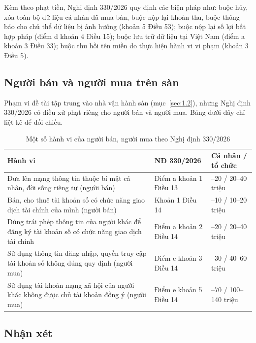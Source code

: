 Kèm theo phạt tiền, Nghị định 330/2026 quy định các biện pháp như: buộc hủy, xóa toàn bộ dữ liệu cá nhân đã mua bán, buộc nộp lại khoản thu, buộc thông báo cho chủ thể dữ liệu bị ảnh hưởng (khoản 5 Điều 53); buộc nộp lại số lợi bất hợp pháp (điểm d khoản 4 Điều 15); buộc lưu trữ dữ liệu tại Việt Nam (điểm a khoản 3 Điều 33); buộc thu hồi tên miền do thực hiện hành vi vi phạm (khoản 3 Điều 5).

\subsection{Người bán và người mua trên sàn}\label{sec:7.3}

Phạm vi đề tài tập trung vào nhà vận hành sàn (mục~\ref{sec:1.2}), nhưng Nghị định 330/2026 có điều xử phạt riêng cho người bán và người mua. Bảng dưới đây chỉ liệt kê để đối chiếu.

{\small{}
\begin{table}[H]
\centering
\caption{Một số hành vi của người bán, người mua theo Nghị định 330/2026}\label{tab:7.2}
\begin{tabularx}{\textwidth}{>{\hsize=1.4\hsize\raggedright\arraybackslash}X>{\hsize=0.8\hsize\raggedright\arraybackslash}X>{\hsize=0.8\hsize\raggedright\arraybackslash}X}
\toprule
\textbf{Hành vi} & \textbf{NĐ 330/2026} & \textbf{Cá nhân / tổ chức} \\
\midrule
Đưa lên mạng thông tin thuộc bí mật cá nhân, đời sống riêng tư (người bán) & Điểm a khoản 1 Điều 13 & 10--20 / 20--40 triệu \\
Bán, cho thuê tài khoản số có chức năng giao dịch tài chính của mình (người bán) & Khoản 1 Điều 14 & 5--10 / 10--20 triệu \\
Dùng trái phép thông tin của người khác để đăng ký tài khoản số có chức năng giao dịch tài chính & Điểm a khoản 2 Điều 14 & 10--20 / 20--40 triệu \\
Sử dụng thông tin đăng nhập, quyền truy cập tài khoản số không đúng quy định (người mua) & Điểm c khoản 3 Điều 14 & 20--30 / 40--60 triệu \\
Sử dụng tài khoản mạng xã hội của người khác không được chủ tài khoản đồng ý (người mua) & Điểm e khoản 5 Điều 14 & 50--70 / 100--140 triệu \\
\bottomrule
\end{tabularx}
\end{table}}

\subsection{Nhận xét}\label{sec:7.4}

